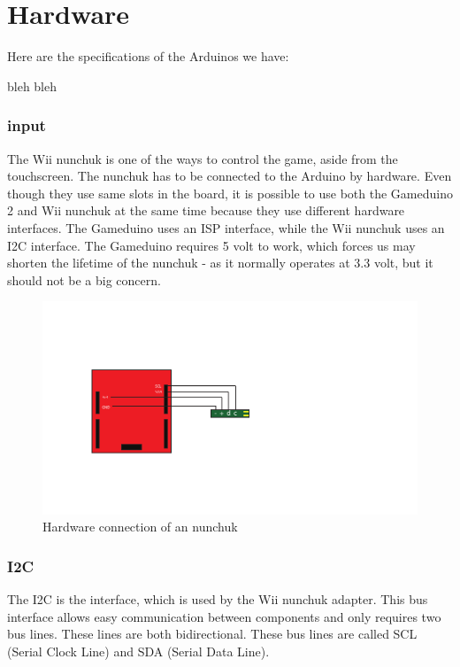 \chapter{Hardware}

Here are the specifications of the Arduinos we have:

bleh bleh


\subsection{input}
The Wii nunchuk is one of the ways to control the game, aside from the
touchscreen.
The nunchuk has to be connected to the Arduino by hardware. Even though they
use same slots in the board, it is possible to use both the Gameduino 2 and Wii
nunchuk at the same time because they use different hardware interfaces. The
Gameduino uses an ISP interface, while the Wii nunchuk uses an I2C interface.
The Gameduino requires 5 volt to work, which forces us may shorten the lifetime
of the nunchuk - as it normally operates at 3.3 volt, but it should not be a
big concern.


\begin{figure}[h]
\centering
\includegraphics{Figures/NunchuckConnection}
\caption{Hardware connection of an nunchuk}
\label{fig:nunchuk_connect}
\end{figure}


\subsection{I2C}
The I2C is the interface, which is used by the Wii nunchuk adapter. This bus
interface allows easy communication between components and only requires two
bus lines. These lines are both bidirectional. These bus lines are called SCL
(Serial Clock Line) and SDA (Serial Data Line).


